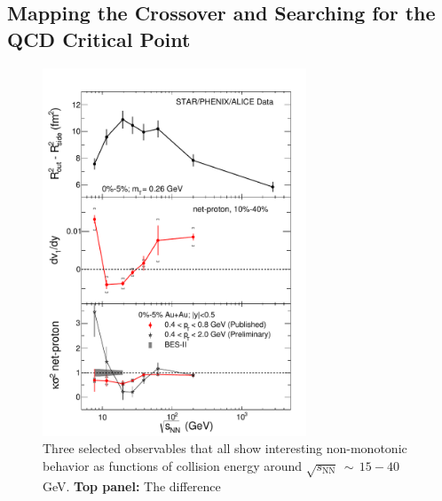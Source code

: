 \subsection{Mapping the Crossover and Searching for the QCD Critical Point}
\label{Sec:CP}


%
\begin{figure}[!thp]
\vspace{-0.3in}
\begin{center}
\centerline{  \includegraphics[width=0.7\textwidth]{fig/bes_compilation_prl_cpod.pdf}}
\caption[Observables showing non-monotonic behavior as a function of $\sqrt{s_\mathrm{NN}}$]{Three selected observables
  that all show interesting non-monotonic behavior as functions of collision energy around  $\sqrt{s_\mathrm{NN}}{\,\sim\,}15{-}40$\,GeV.  
    {\bf Top panel:}
  The difference 
}
\end{center}
\end{figure}
